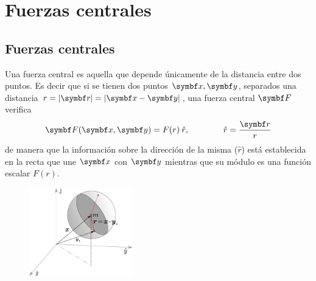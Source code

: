 \documentclass[10pt,oneside]{CBFT_book}
\begin{document}

\chapter{Fuerzas centrales}

\section{Fuerzas centrales}


Una fuerza central es aquella que depende únicamente de la distancia entre dos puntos. Es decir que si se tienen dos
puntos $\vb{x}, \vb{y}$, separados una distancia $ r = |\vb{r}| = |\vb{x} - \vb{y}| $, una fuerza central $\vb{F}$ verifica
\[
	\vb{F}( \vb{x}, \vb{y} ) = F(r) \: \hat{r}, \qquad \qquad \hat{r} = \frac{\vb{r}}{r}
\]
de manera que la información sobre la dirección de la misma ($\hat{r}$) está establecida en la recta que une $\vb{x}$ con 
$\vb{y}$ mientras que su módulo es una función escalar $F(r)$.


\begin{figure}[!hbt]
	\begin{center}
	\includegraphics[width=0.4\textwidth]{images/fig_fuerza_central.pdf}	 
	\end{center}
	\caption{}
\end{figure} 
\end{document}
